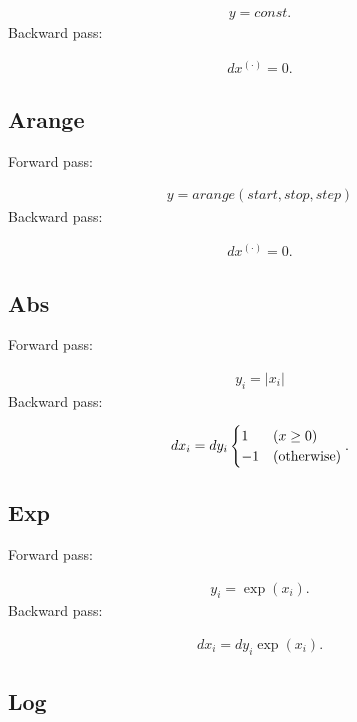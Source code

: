 \documentclass{article}
\begin{document}
\begin{eqnarray}
  y = const.
\end{eqnarray}
%
Backward pass:

\begin{eqnarray}
  dx^{(\cdot)} = 0.
\end{eqnarray}

\subsection{Arange}

Forward pass:

\begin{eqnarray}
  y = arange(start, stop, step)
\end{eqnarray}
%
Backward pass:

\begin{eqnarray}
  dx^{(\cdot)} = 0.
\end{eqnarray}

\subsection{Abs}

Forward pass:

\begin{eqnarray}
  y_i = |x_i|    
\end{eqnarray}
%
Backward pass:

\begin{eqnarray}
  dx_i = dy_i \begin{cases}
    1 & (x \geq 0) \\
    -1 & ({\rm otherwise})
  \end{cases}.
\end{eqnarray}


\subsection{Exp}

Forward pass:

\begin{eqnarray}
  y_i = \exp(x_i).    
\end{eqnarray}
%
Backward pass:

\begin{eqnarray}
  dx_i = dy_i \exp(x_i).  
\end{eqnarray}


\subsection{Log}
\end{document}
